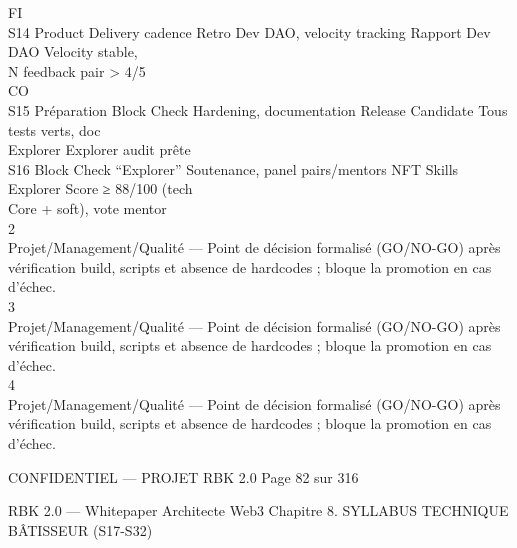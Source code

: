 \vspace{0.5em}
\vspace{0.5em}
\vspace{0.5em}
FI\\
S14     Product Delivery cadence             Retro Dev DAO, velocity tracking   Rapport Dev DAO          Velocity stable,\\
\vspace{0.5em}
N                                                          feedback pair \textgreater{} 4/5\\
CO\\
S15     Préparation Block Check              Hardening, documentation           Release Candidate        Tous tests verts, doc\\
Explorer                                                                Explorer                 audit prête\\
S16     Block Check “Explorer”               Soutenance, panel pairs/mentors    NFT Skills Explorer      Score ≥ 88/100 (tech\\
Core                     + soft), vote mentor\\
\vspace{0.5em}
\vspace{0.5em}
\vspace{0.5em}
\vspace{0.5em}
2\\
Projet/Management/Qualité — Point de décision formalisé (GO/NO-GO) après vérification build, scripts et absence de hardcodes ; bloque la promotion en cas d’échec.\\
3\\
Projet/Management/Qualité — Point de décision formalisé (GO/NO-GO) après vérification build, scripts et absence de hardcodes ; bloque la promotion en cas d’échec.\\
4\\
Projet/Management/Qualité — Point de décision formalisé (GO/NO-GO) après vérification build, scripts et absence de hardcodes ; bloque la promotion en cas d’échec.\\
\vspace{0.5em}
\vspace{0.5em}
\begin{confidential}CONFIDENTIEL — PROJET RBK 2.0                                          Page 82 sur 316\end{confidential}
RBK 2.0 — Whitepaper Architecte Web3                                                                     Chapitre 8. SYLLABUS TECHNIQUE\\
\vspace{0.5em}
\vspace{0.5em}
\vspace{0.5em}
BÂTISSEUR (S17-S32)\\
\vspace{0.5em}
